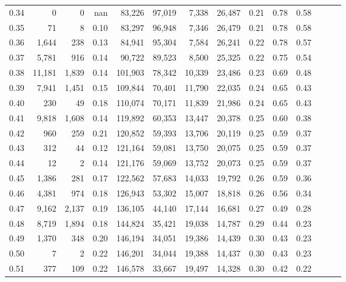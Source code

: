 \begin{tabular}{rrrrrrrrrrrrrr}
0.34 &       0 &      0 &   nan &   83,226 &   97,019 &   7,338 &  26,487 &  0.21 &  0.78 &      0.58 \\
0.35 &      71 &      8 &  0.10 &   83,297 &   96,948 &   7,346 &  26,479 &  0.21 &  0.78 &      0.58 \\
0.36 &   1,644 &    238 &  0.13 &   84,941 &   95,304 &   7,584 &  26,241 &  0.22 &  0.78 &      0.57 \\
0.37 &   5,781 &    916 &  0.14 &   90,722 &   89,523 &   8,500 &  25,325 &  0.22 &  0.75 &      0.54 \\
0.38 &  11,181 &  1,839 &  0.14 &  101,903 &   78,342 &  10,339 &  23,486 &  0.23 &  0.69 &      0.48 \\
0.39 &   7,941 &  1,451 &  0.15 &  109,844 &   70,401 &  11,790 &  22,035 &  0.24 &  0.65 &      0.43 \\
0.40 &     230 &     49 &  0.18 &  110,074 &   70,171 &  11,839 &  21,986 &  0.24 &  0.65 &      0.43 \\
0.41 &   9,818 &  1,608 &  0.14 &  119,892 &   60,353 &  13,447 &  20,378 &  0.25 &  0.60 &      0.38 \\
0.42 &     960 &    259 &  0.21 &  120,852 &   59,393 &  13,706 &  20,119 &  0.25 &  0.59 &      0.37 \\
0.43 &     312 &     44 &  0.12 &  121,164 &   59,081 &  13,750 &  20,075 &  0.25 &  0.59 &      0.37 \\
0.44 &      12 &      2 &  0.14 &  121,176 &   59,069 &  13,752 &  20,073 &  0.25 &  0.59 &      0.37 \\
0.45 &   1,386 &    281 &  0.17 &  122,562 &   57,683 &  14,033 &  19,792 &  0.26 &  0.59 &      0.36 \\
0.46 &   4,381 &    974 &  0.18 &  126,943 &   53,302 &  15,007 &  18,818 &  0.26 &  0.56 &      0.34 \\
0.47 &   9,162 &  2,137 &  0.19 &  136,105 &   44,140 &  17,144 &  16,681 &  0.27 &  0.49 &      0.28 \\
0.48 &   8,719 &  1,894 &  0.18 &  144,824 &   35,421 &  19,038 &  14,787 &  0.29 &  0.44 &      0.23 \\
0.49 &   1,370 &    348 &  0.20 &  146,194 &   34,051 &  19,386 &  14,439 &  0.30 &  0.43 &      0.23 \\
0.50 &       7 &      2 &  0.22 &  146,201 &   34,044 &  19,388 &  14,437 &  0.30 &  0.43 &      0.23 \\
0.51 &     377 &    109 &  0.22 &  146,578 &   33,667 &  19,497 &  14,328 &  0.30 &  0.42 &      0.22 \\

\end{tabular}
